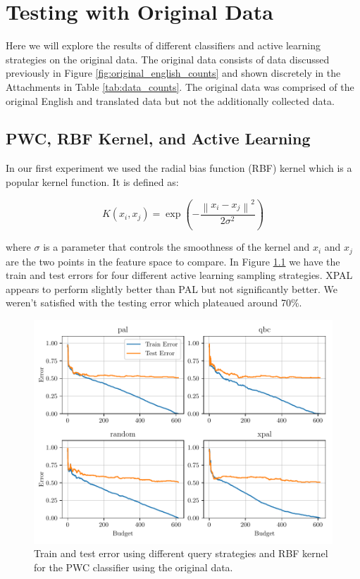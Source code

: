 \chapter{Testing with Original Data}

Here we will explore the results of different classifiers and active learning strategies on the original data. The original data consists of data discussed previously in Figure \ref{fig:original_english_counts} and shown discretely in the Attachments in Table \ref{tab:data_counts}. The original data was comprised of the original English and translated data but not the additionally collected data. 

\section{PWC, RBF Kernel, and Active Learning}

In our first experiment we used the radial bias function (RBF) kernel which is a popular kernel function. It is defined as:

\begin{equation}
    K(x_i, x_j) = \exp\left(- \frac{\left\| x_i - x_j \right\|^2}{2 \sigma^2}\right)
\label{eq:rbf_kernel}
\end{equation}

where $\sigma$ is a parameter that controls the smoothness of the kernel and $x_i$ and $x_j$ are the two points in the feature space to compare. In Figure \ref{fig:plot_all_results_rbf} we have the train and test errors for four different active learning sampling strategies. XPAL appears to perform slightly better than PAL but not significantly better. We weren't satisfied with the testing error which plateaued around 70\%.

\begin{figure}[ht]
  \centering
  \includegraphics[width=\scale\textwidth]{../img/plot_all_results_rbf_original_data.pdf}
  \caption{Train and test error using different query strategies and RBF kernel for the PWC classifier using the original data.}
  \label{fig:plot_all_results_rbf}
\end{figure}

